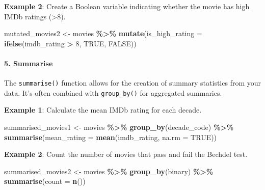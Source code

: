 \documentclass[
]{book}
\newenvironment{Shaded}{\begin{snugshade}}{\end{snugshade}}
\newcommand{\AttributeTok}[1]{\textcolor[rgb]{0.13,0.29,0.53}{#1}}
\newcommand{\ConstantTok}[1]{\textcolor[rgb]{0.56,0.35,0.01}{#1}}
\newcommand{\DecValTok}[1]{\textcolor[rgb]{0.00,0.00,0.81}{#1}}
\newcommand{\FunctionTok}[1]{\textcolor[rgb]{0.13,0.29,0.53}{\textbf{#1}}}
\newcommand{\NormalTok}[1]{#1}
\newcommand{\OtherTok}[1]{\textcolor[rgb]{0.56,0.35,0.01}{#1}}
\newcommand{\SpecialCharTok}[1]{\textcolor[rgb]{0.81,0.36,0.00}{\textbf{#1}}}
\begin{document}
\textbf{Example 2}: Create a Boolean variable indicating whether the movie has high IMDb ratings (\textgreater8).

\begin{Shaded}
\begin{Highlighting}[]
\NormalTok{mutated\_movies2 }\OtherTok{\textless{}{-}}\NormalTok{ movies }\SpecialCharTok{\%\textgreater{}\%}
  \FunctionTok{mutate}\NormalTok{(}\AttributeTok{is\_high\_rating =} \FunctionTok{ifelse}\NormalTok{(imdb\_rating }\SpecialCharTok{\textgreater{}} \DecValTok{8}\NormalTok{, }\ConstantTok{TRUE}\NormalTok{, }\ConstantTok{FALSE}\NormalTok{))}
\end{Highlighting}
\end{Shaded}

\hypertarget{summarise}{%
\paragraph*{5. Summarise}\label{summarise}}

The \texttt{summarise()} function allows for the creation of summary statistics from your data. It's often combined with \texttt{group\_by()} for aggregated summaries.

\textbf{Example 1}: Calculate the mean IMDb rating for each decade.

\begin{Shaded}
\begin{Highlighting}[]
\NormalTok{summarised\_movies1 }\OtherTok{\textless{}{-}}\NormalTok{ movies }\SpecialCharTok{\%\textgreater{}\%}
  \FunctionTok{group\_by}\NormalTok{(decade\_code) }\SpecialCharTok{\%\textgreater{}\%}
  \FunctionTok{summarise}\NormalTok{(}\AttributeTok{mean\_rating =} \FunctionTok{mean}\NormalTok{(imdb\_rating, }\AttributeTok{na.rm =} \ConstantTok{TRUE}\NormalTok{))}
\end{Highlighting}
\end{Shaded}

\textbf{Example 2}: Count the number of movies that pass and fail the Bechdel test.

\begin{Shaded}
\begin{Highlighting}[]
\NormalTok{summarised\_movies2 }\OtherTok{\textless{}{-}}\NormalTok{ movies }\SpecialCharTok{\%\textgreater{}\%}
  \FunctionTok{group\_by}\NormalTok{(binary) }\SpecialCharTok{\%\textgreater{}\%}
  \FunctionTok{summarise}\NormalTok{(}\AttributeTok{count =} \FunctionTok{n}\NormalTok{())}
\end{Highlighting}
\end{Shaded}
\end{document}
